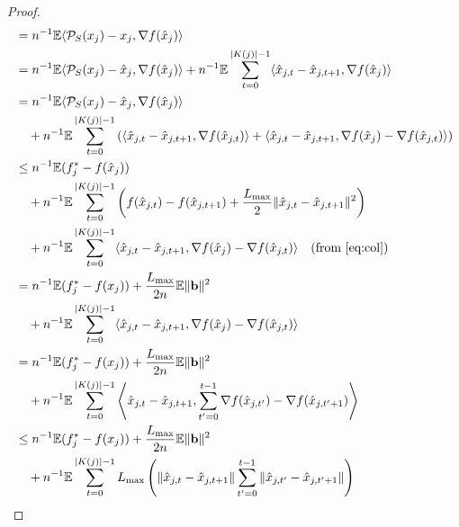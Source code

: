 \documentclass{siamltex}
\begin{document}
\begin{proof}
\begin{align}
\nonumber
& = n^{-1}{\mathbb{E}} \langle {\mathcal{P}_{S}}(x_j)-x_j, \nabla f({\hat{x}}_{j})  \rangle \\
\nonumber
& = n^{-1}{\mathbb{E}} \langle {\mathcal{P}_{S}}(x_j)-{\hat{x}}_{j}, \nabla f({\hat{x}}_{j})  \rangle
 + n^{-1}{\mathbb{E}} \sum_{t=0}^{|K(j)|-1}\langle {\hat{x}}_{j, t}-{\hat{x}}_{j, t+1}, \nabla f({\hat{x}}_{j})  \rangle \\
\nonumber
& = n^{-1}{\mathbb{E}} \langle {\mathcal{P}_{S}}(x_j)-{\hat{x}}_{j}, \nabla f({\hat{x}}_{j})  \rangle  \\
\nonumber
& \quad + n^{-1}{\mathbb{E}} \sum_{t=0}^{|K(j)|-1} \left(\langle {\hat{x}}_{j, t}-{\hat{x}}_{j, t+1}, \nabla f({\hat{x}}_{j, t})  \rangle+ \langle {\hat{x}}_{j, t}-{\hat{x}}_{j, t+1}, \nabla f({\hat{x}}_{j}) - \nabla f({\hat{x}}_{j, t})  \rangle \right)
\\ \nonumber
& \leq n^{-1}{\mathbb{E}} (f^*_j- f({\hat{x}}_{j})) 
\\ \nonumber
& \quad
+ n^{-1} {\mathbb{E}} \sum_{t=0}^{|K(j)|-1}\left( f({\hat{x}}_{j, t})-f({\hat{x}}_{j, t+1}) + {{L_{\mbox{\rm\scriptsize max}}}\over 2}\|{\hat{x}}_{j, t}-{\hat{x}}_{j, t+1}\|^2 \right) \\
\nonumber
& \quad +n^{-1} {\mathbb{E}} \sum_{t=0}^{|K(j)|-1} \langle {\hat{x}}_{j, t}-{\hat{x}}_{j, t+1}, \nabla f({\hat{x}}_{j}) - \nabla f({\hat{x}}_{j, t})  \rangle \quad (\text{from \eqref{eq:col}})
\\ \nonumber
& = n^{-1}{\mathbb{E}} (f^*_j- f(x_{j})) + {{L_{\mbox{\rm\scriptsize max}}}\over 2n} {\mathbb{E}} \|\bold{b}\|^2 
\\ \nonumber
&\quad
+n^{-1} {\mathbb{E}} \sum_{t=0}^{|K(j)|-1} \langle {\hat{x}}_{j, t}-{\hat{x}}_{j, t+1}, \nabla f({\hat{x}}_{j}) - \nabla f({\hat{x}}_{j, t})  \rangle\\
\nonumber
& = n^{-1}{\mathbb{E}} (f^*_j- f(x_{j})) + {{L_{\mbox{\rm\scriptsize max}}}\over 2n} {\mathbb{E}} \|\bold{b}\|^2 
\\ \nonumber
& \quad 
+n^{-1} {\mathbb{E}} \sum_{t=0}^{|K(j)|-1} \left\langle {\hat{x}}_{j, t}-{\hat{x}}_{j, t+1}, \sum_{t'=0}^{t-1}\nabla f({\hat{x}}_{j,t'}) - \nabla f({\hat{x}}_{j,t'+1})  \right\rangle \\
\nonumber
& \leq n^{-1}{\mathbb{E}} (f^*_j- f(x_{j})) + {{L_{\mbox{\rm\scriptsize max}}}\over 2n} {\mathbb{E}} \|\bold{b}\|^2 
\\ \nonumber
& \quad 
+n^{-1} {\mathbb{E}} \sum_{t=0}^{|K(j)|-1}  {L_{\mbox{\rm\scriptsize max}}}\left(\|{\hat{x}}_{j, t}-{\hat{x}}_{j, t+1}\|\sum_{t'=0}^{t-1} \|{\hat{x}}_{j,t'}-{\hat{x}}_{j,t'+1}\|\right) \\

\end{align}
\end{proof}
\end{document}
